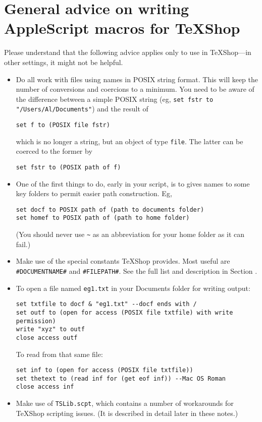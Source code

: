 \documentclass[11pt]{amsart}
\begin{document}
\section{General advice on writing AppleScript macros for TeXShop}
Please understand that the following advice applies only to use in TeXShop---in other settings, it might not be helpful.
\begin{itemize}
\item
Do all work with files using names in POSIX string format. This will keep the number of conversions and coercions to a minimum. You need to be aware of the difference between a simple POSIX string (eg, \verb|set fstr to "/Users/Al/Documents"|) and the result of 
\begin{verbatim}
set f to (POSIX file fstr)
\end{verbatim} which is no longer a string, but an object of type {\tt file}. The latter can be coerced to the former by 
\begin{verbatim}
set fstr to (POSIX path of f)
\end{verbatim}
\item One of the first things to do, early in your script, is to gives names to some key folders to permit easier path construction. Eg,
\begin{verbatim}
set docf to POSIX path of (path to documents folder)
set homef to POSIX path of (path to home folder)
\end{verbatim}
(You should never use \verb|~| as an abbreviation for your home folder as it can fail.)
\item Make use of the special constants TeXShop provides. Most useful are \verb|#DOCUMENTNAME#| and \verb|#FILEPATH#|. See the full list and description in Section .
\item To open a file named {\tt eg1.txt} in your Documents folder for writing output:
\begin{verbatim}
set txtfile to docf & "eg1.txt" --docf ends with /
set outf to (open for access (POSIX file txtfile) with write permission)
write "xyz" to outf
close access outf
\end{verbatim}
To read from that same file:
\begin{verbatim}
set inf to (open for access (POSIX file txtfile))
set thetext to (read inf for (get eof inf)) --Mac OS Roman
close access inf
\end{verbatim}
\item Make use of {\tt TSLib.scpt}, which contains a number of workarounds for TeXShop scripting issues. (It is described in detail later in these notes.)

\end{itemize}
\end{document}
